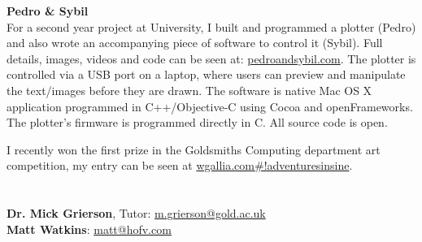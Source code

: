 \documentclass[margin,line,a4paper]{resume}
\begin{document}
\begin{resume}
\textbf{Pedro \& Sybil} \vspace{1mm} \\
For a second year project at University, I built and programmed a plotter (Pedro) and also wrote an accompanying piece of software to control it (Sybil). Full details, images, videos and code can be seen at: \href{http://pedroandsybil.com}{pedroandsybil.com}. The plotter is controlled via a USB port on a laptop, where users can preview and manipulate the text/images before they are drawn.  The software is native Mac OS X application programmed in C++/Objective-C using Cocoa and openFrameworks. The plotter’s firmware is programmed directly in C. All source code is open.

I recently won the first prize in the Goldsmiths Computing department art competition, my entry can be seen at \href{http://wgallia.com#!adventuresinsine}{wgallia.com\#!adventuresinsine}. 

\section{}

\hypersetup{urlcolor=Fuchsia}
%
\textbf{Dr. Mick Grierson}, Tutor: \href{mailto:m.grierson@gold.ac.uk}{m.grierson@gold.ac.uk}
\vspace{2mm} \\
\textbf{Matt Watkins}: \href{mailto:matt@hofv.com}{matt@hofv.com}
\vspace{2mm} \\

\end{resume}
\end{document}
